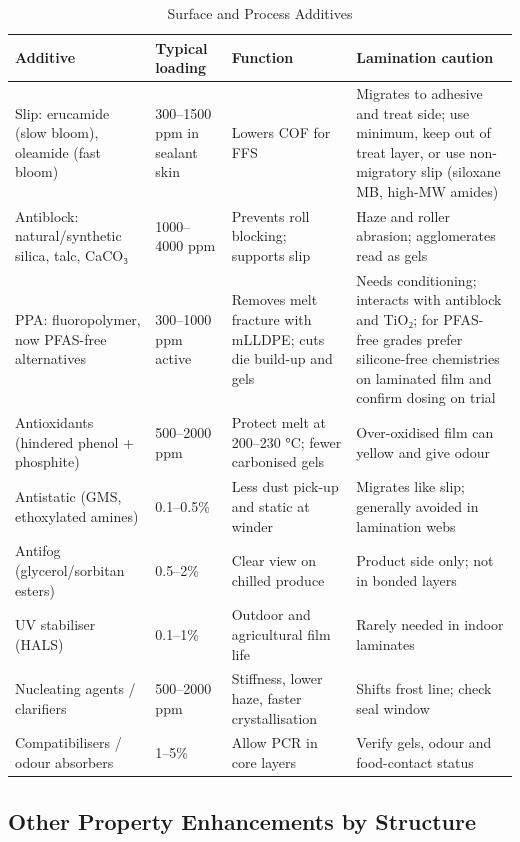 \documentclass[10pt,twocolumn,a4paper]{article}
\begin{document}
\begin{table}[!t]
\caption{Surface and Process Additives}
\label{tab:surf}
\footnotesize
\begin{tabularx}{\textwidth}{@{}p{45mm}p{30mm}p{45mm}L@{}}
\toprule
\textbf{Additive} & \textbf{Typical loading} & \textbf{Function} & \textbf{Lamination caution}\\
\midrule
Slip: erucamide (slow bloom), oleamide (fast bloom) & 300–1500 ppm in sealant skin & Lowers COF for FFS & Migrates to adhesive and treat side; use minimum, keep out of treat layer, or use non-migratory slip (siloxane MB, high-MW amides)\\
Antiblock: natural/synthetic silica, talc, CaCO₃ & 1000–4000 ppm & Prevents roll blocking; supports slip & Haze and roller abrasion; agglomerates read as gels\\
PPA: fluoropolymer, now PFAS-free alternatives & 300–1000 ppm active & Removes melt fracture with mLLDPE; cuts die build-up and gels & Needs conditioning; interacts with antiblock and TiO₂; for PFAS-free grades prefer silicone-free chemistries on laminated film and confirm dosing on trial\\
Antioxidants (hindered phenol + phosphite) & 500–2000 ppm & Protect melt at 200–230 °C; fewer carbonised gels & Over-oxidised film can yellow and give odour\\
Antistatic (GMS, ethoxylated amines) & 0.1–0.5\% & Less dust pick-up and static at winder & Migrates like slip; generally avoided in lamination webs\\
Antifog (glycerol/sorbitan esters) & 0.5–2\% & Clear view on chilled produce & Product side only; not in bonded layers\\
UV stabiliser (HALS) & 0.1–1\% & Outdoor and agricultural film life & Rarely needed in indoor laminates\\
Nucleating agents / clarifiers & 500–2000 ppm & Stiffness, lower haze, faster crystallisation & Shifts frost line; check seal window\\
Compatibilisers / odour absorbers & 1–5\% & Allow PCR in core layers & Verify gels, odour and food-contact status\\
\bottomrule
\end{tabularx}
\end{table}

\subsection{Other Property Enhancements by Structure}
\end{document}
